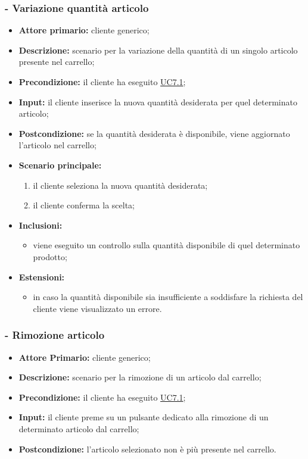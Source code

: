\subsubsection{ - Variazione quantità articolo}
\begin{itemize}
    \item \textbf{Attore primario:} cliente generico;
    \item \textbf{Descrizione:} scenario per la variazione della quantità di un singolo articolo presente nel carrello;
    \item \textbf{Precondizione:} il cliente ha eseguito \hyperref[UC7.1]{UC7.1};
    \item \textbf{Input:} il cliente inserisce la nuova quantità desiderata per quel determinato articolo;
    \item \textbf{Postcondizione:} se la quantità desiderata è disponibile, viene aggiornato l'articolo nel carrello;
    \item \textbf{Scenario principale:}
          \begin{enumerate}
              \item il cliente seleziona la nuova quantità desiderata;
              \item il cliente conferma la scelta;
          \end{enumerate}
    \item \textbf{Inclusioni:}
          \begin{itemize}
              \item viene eseguito un controllo sulla quantità disponibile di quel determinato prodotto;
          \end{itemize}
    \item \textbf{Estensioni:}
          \begin{itemize}
              \item in caso la quantità disponibile sia insufficiente a soddisfare la richiesta del cliente viene visualizzato un errore.
          \end{itemize}
\end{itemize}

\stepsubUserCase
\subsubsection{ - Rimozione articolo}
\begin{itemize}
    \item \textbf{Attore Primario:} cliente generico;
    \item \textbf{Descrizione:} scenario per la rimozione di un articolo dal carrello;
    \item \textbf{Precondizione:} il cliente ha eseguito \hyperref[UC7.1]{UC7.1};
    \item \textbf{Input:} il cliente preme su un pulsante dedicato alla rimozione di un determinato articolo dal carrello;
    \item \textbf{Postcondizione:} l'articolo selezionato non è più presente nel carrello.
\end{itemize}

